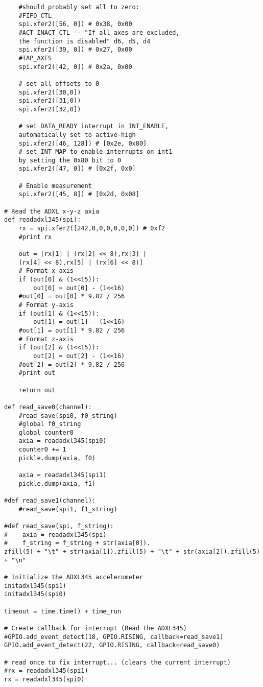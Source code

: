 \documentclass{sigchi}
\begin{document}
\begin{lstlisting}
    #should probably set all to zero:
    #FIFO_CTL
    spi.xfer2([56, 0]) # 0x38, 0x00
    #ACT_INACT_CTL -- "If all axes are excluded, 
    the function is disabled" d6, d5, d4
    spi.xfer2([39, 0]) # 0x27, 0x00
    #TAP_AXES
    spi.xfer2([42, 0]) # 0x2a, 0x00

    # set all offsets to 0
    spi.xfer2([30,0])
    spi.xfer2([31,0])
    spi.xfer2([32,0])

    # set DATA_READY interrupt in INT_ENABLE, 
    automatically set to active-high
    spi.xfer2([46, 128]) # [0x2e, 0x80]
    # set INT_MAP to enable interrupts on int1 
    by setting the 0x80 bit to 0
    spi.xfer2([47, 0]) # [0x2f, 0x0]

    # Enable measurement
    spi.xfer2([45, 8]) # [0x2d, 0x08]

# Read the ADXL x-y-z axia
def readadxl345(spi):
    rx = spi.xfer2([242,0,0,0,0,0,0]) # 0xf2
    #print rx

    out = [rx[1] | (rx[2] << 8),rx[3] | 
    (rx[4] << 8),rx[5] | (rx[6] << 8)]
    # Format x-axis
    if (out[0] & (1<<15)):
        out[0] = out[0] - (1<<16)
    #out[0] = out[0] * 9.82 / 256
    # Format y-axis
    if (out[1] & (1<<15)):
        out[1] = out[1] - (1<<16)
    #out[1] = out[1] * 9.82 / 256
    # Format z-axis
    if (out[2] & (1<<15)):
        out[2] = out[2] - (1<<16)
    #out[2] = out[2] * 9.82 / 256
    #print out

    return out

def read_save0(channel):
    #read_save(spi0, f0_string)
    #global f0_string
    global counter0
    axia = readadxl345(spi0)
    counter0 += 1
    pickle.dump(axia, f0)

    axia = readadxl345(spi1)
    pickle.dump(axia, f1)

#def read_save1(channel):
    #read_save(spi1, f1_string)

#def read_save(spi, f_string):
#    axia = readadxl345(spi)
#    f_string = f_string + str(axia[0]).
zfill(5) + "\t" + str(axia[1]).zfill(5) + "\t" + str(axia[2]).zfill(5) + "\n"

# Initialize the ADXL345 accelerometer
initadxl345(spi1)
initadxl345(spi0)

timeout = time.time() + time_run

# Create callback for interrupt (Read the ADXL345)
#GPIO.add_event_detect(18, GPIO.RISING, callback=read_save1)
GPIO.add_event_detect(22, GPIO.RISING, callback=read_save0) 

# read once to fix interrupt... (clears the current interrupt)
#rx = readadxl345(spi1)
rx = readadxl345(spi0)


\end{lstlisting}
\end{document}
